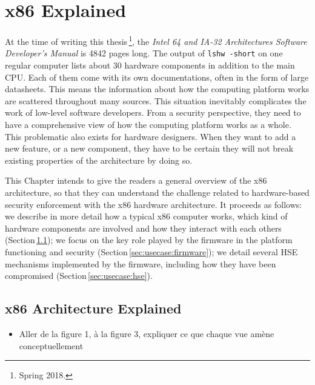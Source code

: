 \chapter{x86 Explained}
\label{chapter:usecase}


At the time of writing this thesis\,\footnote{Spring 2018.}, the \emph{Intel 64
  and IA-32 Architectures Software Developer’s Manual} is 4842 pages long.
%
The output of \texttt{lshw -short} on one regular computer lists about 30
hardware components in addition to the main CPU.
%
Each of them come with its own documentations, often in the form of large
datasheets.
%
This means the information about how the computing platform works are scattered
throughout many sources.
%
This situation inevitably complicates the work of low-level software developers.
%
From a security perspective, they need to have a comprehensive view of how the
computing platform works as a whole.
%
This problematic also exists for hardware designers.
%
When they want to add a new feature, or a new component, they have to be certain
they will not break existing properties of the architecture by doing so.

This Chapter intends to give the readers a general overview of the x86
architecture, so that they can understand the challenge related to
hardware-based security enforcement with the x86 hardware architecture.
%
It proceeds as follows:
%
we describe in more detail how a typical x86 computer works, which kind of
hardware components are involved and how they interact with each others
(Section\,\ref{sec:usecase:architecture});
%
we focus on the key role played by the firmware in the platform functioning and
security (Section\,\ref{sec:usecase:firmware});
%
we detail several HSE mechanisms implemented by the firmware, including how they
have been compromised (Section\,\ref{sec:usecase:hse}).

\section{x86 Architecture Explained}
\label{sec:usecase:architecture}

\begin{itemize}
\item Aller de la figure 1, à la figure 3, expliquer ce que chaque vue amène
  conceptuellement
\end{itemize}

